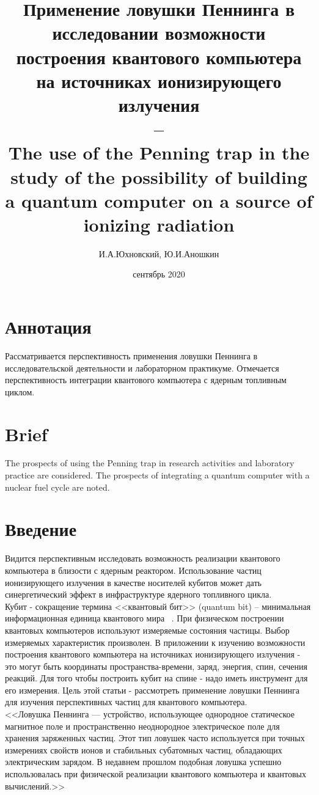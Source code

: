 \documentclass[11pt]{article}
\title{\textbf{Применение ловушки Пеннинга в исследовании возможности построения квантового компьютера на источниках ионизирующего излучения \\ -- \\ 
The use of the Penning trap in the study of the possibility of building a quantum computer on a source of ionizing radiation }}
\author{И.А.Юхновский, Ю.И.Аношкин}
\date{сентябрь 2020}
\begin{document}
\maketitle
\thispagestyle{empty}

\section*{Аннотация}
Рассматривается перспективность применения ловушки Пеннинга в исследовательской деятельности и лабораторном практикуме. Отмечается перспективность интеграции квантового компьютера с ядерным топливным циклом.

\section*{Brief}
The prospects of using the Penning trap in research activities and laboratory practice are considered. The prospects of integrating a quantum computer with a nuclear fuel cycle are noted.

\section{Введение}
Видится перспективным исследовать возможность реализации квантового компьютера в близости с ядерным реактором. Использование частиц ионизирующего излучения в качестве носителей кубитов может дать синергетический эффект в инфраструктуре ядерного топливного цикла.\\

Кубит - сокращение термина <<квантовый бит>> (quantum bit) -- минимальная информационная единица квантового мира ~\cite{Sysoev, Courcera_KvVich}. При физическом построении квантовых компьютеров используют измеряемые состояния частицы. Выбор измеряемых характеристик произволен. В приложении к изучению возможности построения квантового компьютера на источниках ионизирующего излучения - это могут быть координаты  пространства-времени, заряд, энергия, спин, сечения реакций. Для того чтобы построить кубит на спине - надо иметь инструмент для его измерения. Цель этой статьи - рассмотреть применение ловушки Пеннинга для изучения перспективных частиц для квантового компьютера. \\

 <<Ловушка Пеннинга — устройство, использующее однородное статическое магнитное поле и пространственно неоднородное электрическое поле для хранения заряженных частиц. Этот тип ловушек часто используется при точных измерениях свойств ионов и стабильных субатомных частиц, обладающих электрическим зарядом. В недавнем прошлом подобная ловушка успешно использовалась при физической реализации квантового компьютера и квантовых вычислений.>> ~\cite{wiki}
\end{document}
